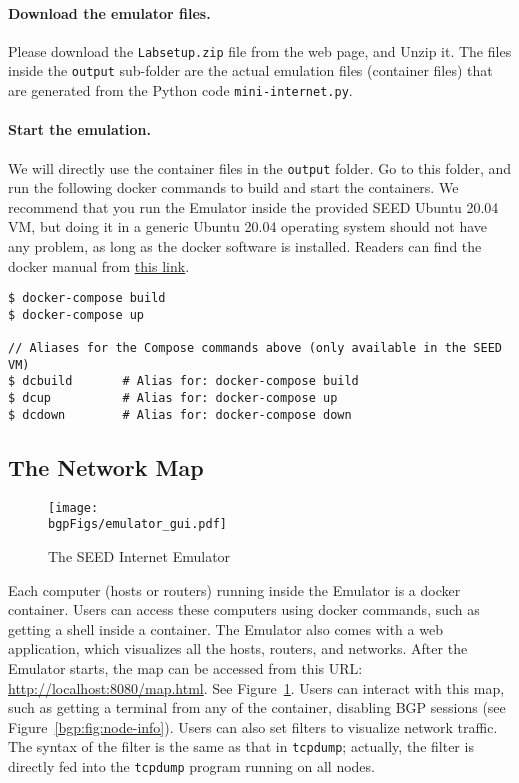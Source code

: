 \paragraph{Download the emulator files.}
Please download the \texttt{Labsetup.zip} file from the web page, and 
Unzip it. The files inside the \texttt{output} sub-folder are the actual
emulation files (container files) that are
generated from the Python code \texttt{mini-internet.py}.


\paragraph{Start the emulation.}
We will directly use the container files in the \texttt{output} folder. 
Go to this folder, and run the following docker commands
to build and start the containers. We recommend that you run the Emulator inside
the provided SEED Ubuntu 20.04 VM, but doing it in a generic Ubuntu 20.04 operating system
should not have any problem, as long as the docker software is installed. 
Readers can find the docker manual from 
\href{https://github.com/seed-labs/seed-labs/blob/master/manuals/docker/SEEDManual-Container.md}
{\underline{this link}}.

\begin{lstlisting}
$ docker-compose build
$ docker-compose up

// Aliases for the Compose commands above (only available in the SEED VM)
$ dcbuild       # Alias for: docker-compose build
$ dcup          # Alias for: docker-compose up
$ dcdown        # Alias for: docker-compose down
\end{lstlisting}


\subsection{The Network Map}

\begin{figure}[htb]
  \begin{center}
    \texttt{[image: \\bgpFigs/emulator\_gui.pdf]}
  \end{center}
  \caption{The SEED Internet Emulator}
  \label{bgp:fig:emulator-map}
\end{figure}
 

Each computer (hosts or routers) running inside the Emulator is a docker container.
Users can access these computers using docker commands, such as getting a shell
inside a container.
The Emulator also comes with a web application, which visualizes all the hosts, routers,
and networks.
After the Emulator starts, the map can be accessed from this
URL: \url{http://localhost:8080/map.html}.
See Figure~\ref{bgp:fig:emulator-map}.
Users can interact with this map, such as getting a terminal from any of the container,
disabling BGP sessions (see Figure~\ref{bgp:fig:node-info}). 
Users can also set filters to visualize network traffic.
The syntax of the filter is the same as that in \texttt{tcpdump}; actually,
the filter is directly fed into the \texttt{tcpdump} program running on all nodes.


